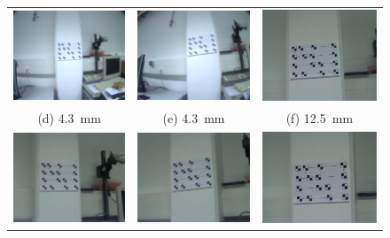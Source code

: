 \documentclass[
a4paper,     %
12pt         %
]{scrartcl}  %
\begin{document}
\begin{figure}[ht!]
\begin{tabular}{ccc}
 \includegraphics[width=48mm]{./Bildg_Messtechnik_Lab/CrossRatio/images/image_a4.png} & \includegraphics[width=48mm]{./Bildg_Messtechnik_Lab/CrossRatio/images/image_a5.png} & \includegraphics[width=48mm]{./Bildg_Messtechnik_Lab/CrossRatio/images/image_b1.png}\\
(d) \SI{4.3}{mm}& (e) \SI{4.3}{mm} & (f) \SI{12.5}{mm}\\[6pt]
 \includegraphics[width=48mm]{./Bildg_Messtechnik_Lab/CrossRatio/images/image_b2.png} & \includegraphics[width=48mm]{./Bildg_Messtechnik_Lab/CrossRatio/images/image_b3.png} & \includegraphics[width=48mm]{./Bildg_Messtechnik_Lab/CrossRatio/images/image_b4.png}\\

\end{tabular}
\end{figure}
\end{document}
